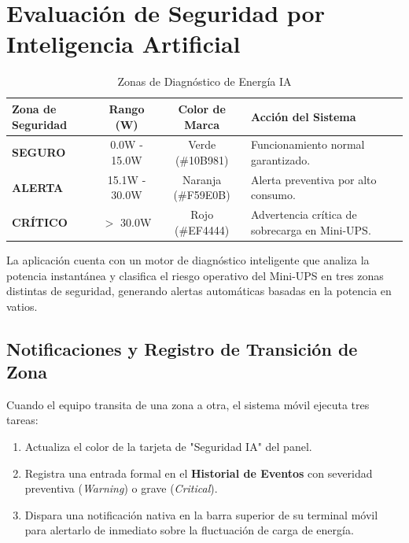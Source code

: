 \documentclass[11pt,a4paper]{article}
\begin{document}
\section{Evaluación de Seguridad por Inteligencia Artificial}

\begin{table}[htbp]
    \centering
    \caption{Zonas de Diagnóstico de Energía IA}
    \begin{tabular}{lccl}
        \toprule
        \textbf{Zona de Seguridad} & \textbf{Rango (W)} & \textbf{Color de Marca} & \textbf{Acción del Sistema} \\
        \midrule
        \textbf{SEGURO} & 0.0W - 15.0W & Verde (\#10B981) & Funcionamiento normal garantizado. \\
        \textbf{ALERTA} & 15.1W - 30.0W & Naranja (\#F59E0B) & Alerta preventiva por alto consumo. \\
        \textbf{CRÍTICO} & $>$ 30.0W & Rojo (\#EF4444) & Advertencia crítica de sobrecarga en Mini-UPS. \\
        \bottomrule
    \end{tabular}
\end{table}

La aplicación cuenta con un motor de diagnóstico inteligente que analiza la potencia instantánea y clasifica el riesgo operativo del Mini-UPS en tres zonas distintas de seguridad, generando alertas automáticas basadas en la potencia en vatios.

\subsection{Notificaciones y Registro de Transición de Zona}
Cuando el equipo transita de una zona a otra, el sistema móvil ejecuta tres tareas:
\begin{enumerate}
    \item Actualiza el color de la tarjeta de "Seguridad IA" del panel.
    \item Registra una entrada formal en el \textbf{Historial de Eventos} con severidad preventiva (\textit{Warning}) o grave (\textit{Critical}).
    \item Dispara una notificación nativa en la barra superior de su terminal móvil para alertarlo de inmediato sobre la fluctuación de carga de energía.
\end{enumerate}
\end{document}

